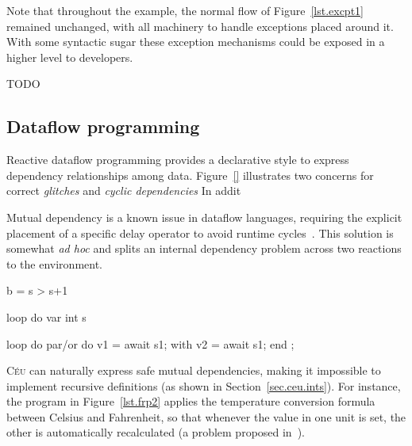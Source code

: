 \documentclass{acm_proc_article-sp}
\newcommand{\CEU}{\textsc{C\'{e}u}\xspace}
\newcommand{\code}[1] {{\small{\texttt{#1}}}}
\newcommand{\1}{\;}
\newcommand{\2}{\;\;}
\newcommand{\3}{\;\;\;}
\newcommand{\5}{\;\;\;\;\;}
\begin{document}
Note that throughout the example, the normal flow of Figure~\ref{lst.excpt1} 
remained unchanged, with all machinery to handle exceptions placed around it.
With some syntactic sugar these exception mechanisms could be exposed in a 
higher level to developers.

TODO

\begin{comment}
In terms of memory usage, switching from the original normal flow (without 
exception throws) to the last example (with recovery) incurred extra 450 bytes 
of ROM and 24 bytes of RAM.

The presented approach for exceptions has the limitation that a file operation 
cannot be called twice within a reaction and that exception handlers cannot 
await other events, which are related to the single-call and single-instance 
property of subroutines in \CEU.
\end{comment}

\subsection{Dataflow programming}
\label{sec.adv.frp}

Reactive dataflow programming \cite{frp.survey} provides a declarative style to 
express dependency relationships among data.
%
Figure~\ref{} illustrates two concerns for correct
\emph{glitches} and \emph{cyclic dependencies}
In addit

Mutual dependency is a known issue in dataflow languages, requiring the 
explicit placement of a specific delay operator to avoid runtime
cycles~\cite{frtime.embedding,luagravity.sblp}.
This solution is somewhat \emph{ad hoc} and splits an internal dependency 
problem across two reactions to the environment.

b = s > s+1

loop do
var int s

loop do
    par/or do
        v1 = await s1;
    with
        v2 = await s1;
    end
    ;


\CEU can naturally express safe mutual dependencies, making it impossible to 
implement recursive definitions (as shown in Section~\ref{sec.ceu.ints}).
For instance, the program in Figure~\ref{lst.frp2} applies the temperature 
conversion formula between Celsius and Fahrenheit, so that whenever the value 
in one unit is set, the other is automatically recalculated (a problem proposed 
in~\cite{frp.survey}).
\end{document}
